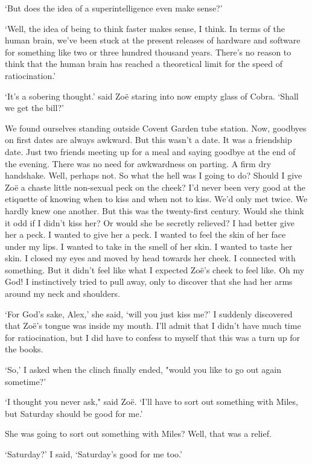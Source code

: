 `But does the idea of a superintelligence even make sense?'

`Well, the idea of being to think faster makes sense, I think. In
terms of the human brain, we've been stuck at the present releases
of hardware and software for something like two or three hundred
thousand years. There's no reason to think that the human brain has
reached a theoretical limit for the speed of ratiocination.'

`It's a sobering thought.' said Zoë staring into now
empty glass of Cobra. `Shall we get the bill?'

We found ourselves standing outside Covent Garden tube station. Now,
goodbyes on first dates are always awkward. But this wasn't a date.
It was a friendship date. Just two friends meeting up for a meal and
saying goodbye at the end of the evening. There was no need for
awkwardness on parting. A firm dry handshake. Well, perhaps not. So
what the hell was I going to do? Should I give Zoë a chaste
little non-sexual peck on the cheek? I'd never been very good at the
etiquette of knowing when to kiss and when not to kiss. We'd only
met twice. We hardly knew one another. But this was the twenty-first
century. Would she think it odd if I didn't kiss her? Or would she
be secretly relieved? I had better give her a peck. I {\twelveit
wanted\/} to give her a peck. I wanted to feel the skin of her face
under my lips. I wanted to take in the smell of her skin. I wanted
to taste her skin. I closed my eyes and moved by head towards her
cheek. I connected with something. But it didn't feel like what I
expected Zoë's cheek to feel like. Oh my God! I instinctively
tried to pull away, only to discover that she had her arms around my
neck and shoulders.

`For God's sake, Alex,' she said, `will you just kiss me?' I
suddenly discovered that Zoë's tongue was inside my mouth. I'll
admit that I didn't have much time for ratiocination, but I did have
to confess to myself that this was a turn up for the books.

`So,' I asked when the clinch finally ended, "would you like to go
out again sometime?'

`I thought you never ask," said Zoë. `I'll have to sort out
something with Miles, but Saturday should be good for me.'

She was going to sort out something with Miles? Well, that was a relief.

`Saturday?' I said, `Saturday's good for me too.'

